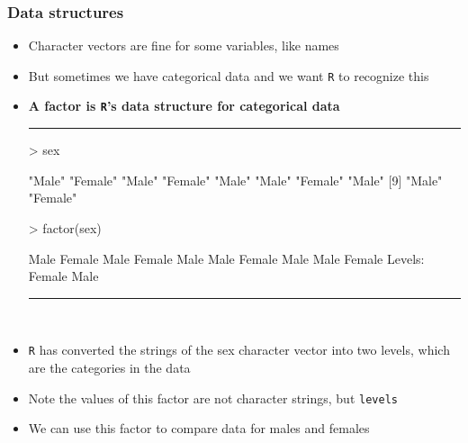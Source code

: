 \documentclass{beamer}
\begin{document}
\begin{frame}[fragile]
	\frametitle{Data structures}
	\begin{itemize}
		\small
		\item Character vectors are fine for some variables, like names
		\item But sometimes we have categorical data and we want \texttt{R} to recognize this
		\item \textbf{A factor is \texttt{R}'s data structure for categorical data}
\rule{\textwidth}{0.4pt}
\scriptsize
\setlength{\fancyvrbtopsep}{-1pt}
\setlength{\fancyvrbpartopsep}{-1pt}
\begin{Schunk}
\begin{Sinput}
> sex
\end{Sinput}
\begin{Soutput}
 [1] "Male"   "Female" "Male"   "Female" "Male"   "Male"   "Female" "Male"  
 [9] "Male"   "Female"
\end{Soutput}
\begin{Sinput}
> factor(sex)
\end{Sinput}
\begin{Soutput}
 [1] Male   Female Male   Female Male   Male   Female Male   Male   Female
Levels: Female Male
\end{Soutput}
\end{Schunk}
\rule{\textwidth}{0.4pt}\\
\small
\vspace{10pt}
		\item \texttt{R} has converted the strings of the sex character vector into two levels, which are the categories in the data
		\item Note the values of this factor are not character strings, but \texttt{levels}
		\item We can use this factor to compare data for males and females
	\end{itemize}
\end{frame}
\end{document}
